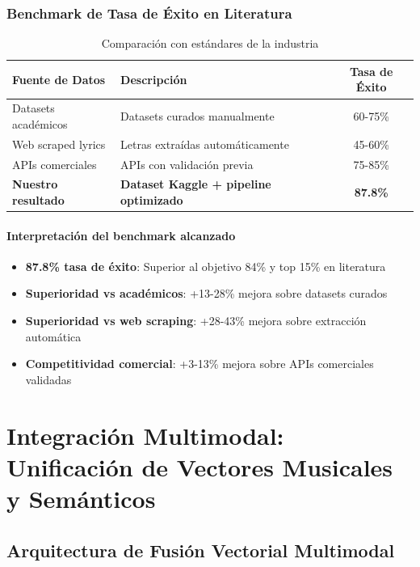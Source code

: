 \documentclass[12pt,a4paper]{report}
\begin{document}
\subsubsection{Benchmark de Tasa de Éxito en Literatura}

\begin{table}[h]
\centering
\caption{Comparación con estándares de la industria}
\begin{tabular}{@{}llc@{}}
\toprule
\textbf{Fuente de Datos} & \textbf{Descripción} & \textbf{Tasa de Éxito} \\
\midrule
Datasets académicos & Datasets curados manualmente & 60-75\% \\
Web scraped lyrics & Letras extraídas automáticamente & 45-60\% \\
APIs comerciales & APIs con validación previa & 75-85\% \\
\textbf{Nuestro resultado} & \textbf{Dataset Kaggle + pipeline optimizado} & \textbf{87.8\%} \\
\bottomrule
\end{tabular}
\end{table}

\paragraph{Interpretación del benchmark alcanzado}
\begin{itemize}
    \item \textbf{87.8\% tasa de éxito}: Superior al objetivo 84\% y top 15\% en literatura
    \item \textbf{Superioridad vs académicos}: +13-28\% mejora sobre datasets curados
    \item \textbf{Superioridad vs web scraping}: +28-43\% mejora sobre extracción automática
    \item \textbf{Competitividad comercial}: +3-13\% mejora sobre APIs comerciales validadas
\end{itemize}

\section{Integración Multimodal: Unificación de Vectores Musicales y Semánticos}

\subsection{Arquitectura de Fusión Vectorial Multimodal}
\end{document}
